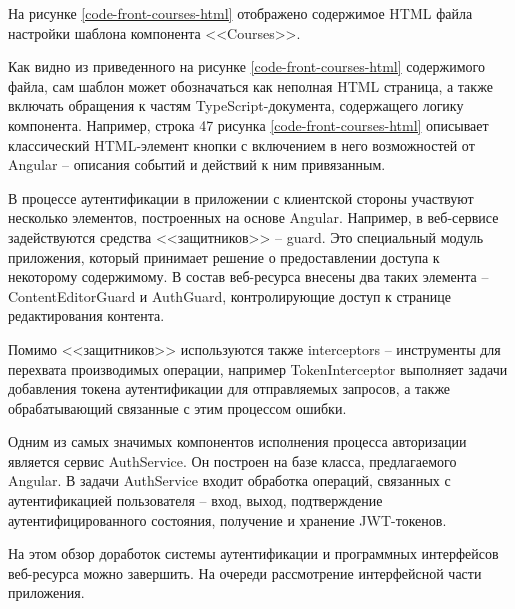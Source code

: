 
На рисунке \ref{code-front-courses-html} отображено содержимое HTML файла настройки шаблона компонента <<Courses>>.


Как видно из приведенного на рисунке \ref{code-front-courses-html} содержимого файла, сам шаблон может обозначаться как неполная HTML страница, а также включать обращения к частям TypeScript-документа, содержащего логику компонента.
Например, строка 47 рисунка \ref{code-front-courses-html} описывает классический HTML-элемент кнопки с включением в него возможностей от Angular -- описания событий и действий к ним привязанным.

В процессе аутентификации в приложении с клиентской стороны участвуют несколько элементов, построенных на основе Angular.
Например, в веб-сервисе задействуются средства <<защитников>> -- guard.
Это специальный модуль приложения, который принимает решение о предоставлении доступа к некоторому содержимому.
В состав веб-ресурса внесены два таких элемента -- ContentEditorGuard и AuthGuard, контролирующие доступ к странице редактирования контента.

Помимо <<защитников>> используются также interceptors -- инструменты для перехвата производимых операции, например TokenInterceptor выполняет задачи добавления токена аутентификации для отправляемых запросов, а также обрабатывающий связанные с этим процессом ошибки.

Одним из самых значимых компонентов исполнения процесса авторизации является сервис AuthService.
Он построен на базе класса, предлагаемого Angular.
В задачи AuthService входит обработка операций, связанных с аутентификацией пользователя -- вход, выход, подтверждение аутентифицированного состояния, получение и хранение JWT-токенов.

На этом обзор доработок системы аутентификации и программных интерфейсов веб-ресурса можно завершить.
На очереди рассмотрение интерфейсной части приложения.
\clearpage
